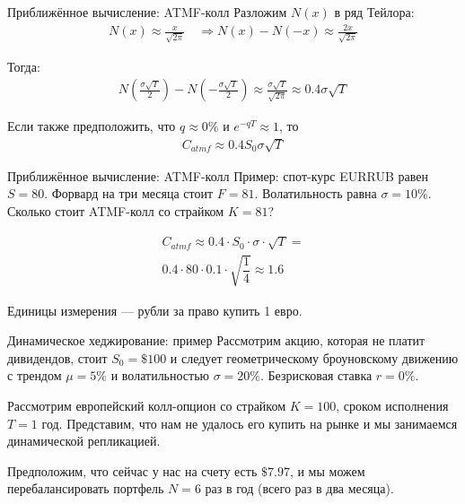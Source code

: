 \documentclass{beamer}
\begin{document}
\begin{frame}{Приближённое вычисление: ATMF-колл}
\justify
Разложим $N(x)$ в ряд Тейлора:
\begin{align*}
N(x) \approx \frac{x}{\sqrt{2\pi}} \quad \Rightarrow
N(x) - N(-x) \approx \frac{2x}{\sqrt{2\pi}}
\end{align*}

Тогда:
\begin{align*}
N\left(\frac{\sigma \sqrt{T}}{2}\right) - N\left(-\frac{\sigma \sqrt{T}}{2}\right)
\approx
\frac{\sigma\sqrt{T}}{\sqrt{2\pi}}
\approx
0.4\sigma\sqrt{T}
\end{align*}

Если также предположить, что $q\approx 0\%$ и $e^{-qT} \approx 1$, то
\begin{align*}
C_{atmf} \approx 0.4 S_0 \sigma \sqrt{T}
\end{align*}
\end{frame}



\begin{frame}{Приближённое вычисление: ATMF-колл}
\justify
Пример: спот-курс EURRUB равен $S=80$. Форвард на три месяца стоит $F=81$. Волатильность равна $\sigma=10\%$. Сколько стоит ATMF-колл со страйком $K=81$?

\begin{align*}
C_{atmf} \approx 0.4 \cdot S_0 \cdot \sigma \cdot \sqrt{T} = \\
0.4 \cdot 80 \cdot 0.1 \cdot \sqrt{\dfrac{1}{4}} \approx 1.6
\end{align*}

Единицы измерения --- рубли за право купить 1 евро.
\end{frame}



\begin{frame}{Динамическое хеджирование: пример}
\justify
Рассмотрим акцию, которая не платит дивидендов, стоит $S_0=\$100$ и следует 
геометрическому броуновскому движению с трендом $\mu=5\%$ и волатильностью
$\sigma=20\%$. Безрисковая ставка $r=0\%$.

\justify
Рассмотрим европейский колл-опцион со страйком $K=100$, сроком исполнения $T=1$ год. 
Представим, что нам не удалось его купить на рынке и мы занимаемся динамической 
репликацией.

\justify
Предположим, что сейчас у нас на счету есть $\$7.97$, и мы можем перебалансировать портфель $N=6$ раз в год (всего раз в два месяца).
\end{frame}
\end{document}
